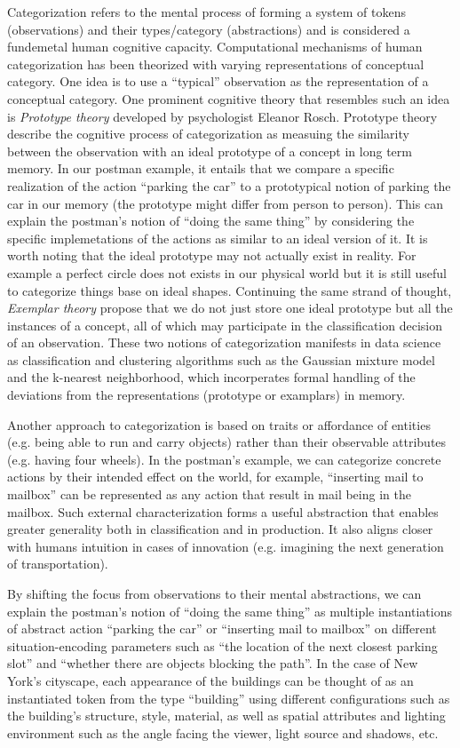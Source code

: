 Categorization refers to the mental process of forming a system of tokens (observations) and their types/category (abstractions) and is considered a fundemetal human cognitive capacity.\cite{}
Computational mechanisms of human categorization has been theorized with varying representations of conceptual category. One idea is to use a ``typical'' observation as the representation of a conceptual category. One prominent cognitive theory that resembles such an idea is \emph{Prototype theory}\cite{} developed by psychologist Eleanor Rosch. Prototype theory describe the cognitive process of categorization as measuing the similarity between the observation with an ideal prototype of a concept in long term memory. In our postman example, it entails that we compare a specific realization of the action ``parking the car'' to a prototypical notion of parking the car in our memory (the prototype might differ from person to person). This can explain the postman's notion of ``doing the same thing'' by considering the specific implemetations of the actions as similar to an ideal version of it. It is worth noting that the ideal prototype may not actually exist in reality. For example a perfect circle does not exists in our physical world but it is still useful to categorize things base on ideal shapes. Continuing the same strand of thought, \emph{Exemplar theory}\cite{} propose that we do not just store one ideal prototype but all the instances of a concept, all of which may participate in the classification decision of an observation. These two notions of categorization manifests in data science as classification and clustering algorithms such as the Gaussian mixture model\cite{} and the k-nearest neighborhood\cite{}, which incorperates formal handling of the deviations from the representations (prototype or examplars) in memory. 


Another approach to categorization is based on traits or affordance of entities (e.g. being able to run and carry objects) rather than their observable attributes (e.g. having four wheels). In the postman's example, we can categorize concrete actions by their intended effect on the world, for example, ``inserting mail to mailbox'' can be represented as any action that result in mail being in the mailbox. Such external characterization forms a useful abstraction that enables greater generality both in classification and in production. It also aligns closer with humans intuition in cases of innovation (e.g. imagining the next generation of transportation).


By shifting the focus from observations to their mental abstractions, we can explain the postman's notion of ``doing the same thing'' as multiple instantiations of abstract action ``parking the car'' or ``inserting mail to mailbox'' on different situation-encoding parameters such as ``the location of the next closest parking slot'' and ``whether there are objects blocking the path''. In the case of New York's cityscape, each appearance of the buildings can be thought of as an instantiated token from the type ``building'' using different configurations such as the building's structure, style, material, as well as spatial attributes and lighting environment such as the angle facing the viewer, light source and shadows, etc. 


